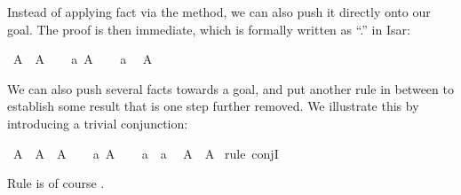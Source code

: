 \begin{isabellebody}
\begin{isamarkuptext}
Instead of applying fact  via the  method, we can
also push it directly onto our goal.  The proof is then immediate,
which is formally written as ``.'' in Isar:%
\end{isamarkuptext}%
\isamarkuptrue%
\isamarkupfalse%
\ {\isachardoublequoteopen}A\ {\isasymlongrightarrow}\ A{\isachardoublequoteclose}\isanewline
%
\isadelimproof
%
\endisadelimproof
%
\isatagproof
{}\isamarkupfalse%
\isanewline
\ \ \isamarkupfalse%
\ a{\isacharcolon}\ {\isachardoublequoteopen}A{\isachardoublequoteclose}\isanewline
\ \ \isamarkupfalse%
\ a\ \isamarkupfalse%
\ {\isachardoublequoteopen}A{\isachardoublequoteclose}\ \isacommand{{\isachardot}}\isamarkupfalse%
\isanewline
{}\isamarkupfalse%
%
\endisatagproof
{\isafoldproof}%
%
\isadelimproof
%
\endisadelimproof
%
\begin{isamarkuptext}%
We can also push several facts towards a goal, and put another
rule in between to establish some result that is one step further
removed.  We illustrate this by introducing a trivial conjunction:%
\end{isamarkuptext}%
\isamarkuptrue%
\isamarkupfalse%
\ {\isachardoublequoteopen}A\ {\isasymlongrightarrow}\ A\ {\isasymand}\ A{\isachardoublequoteclose}\isanewline
%
\isadelimproof
%
\endisadelimproof
%
\isatagproof
{}\isamarkupfalse%
\isanewline
\ \ \isamarkupfalse%
\ a{\isacharcolon}\ {\isachardoublequoteopen}A{\isachardoublequoteclose}\isanewline
\ \ \isamarkupfalse%
\ a\ \ a\ \isamarkupfalse%
\ {\isachardoublequoteopen}A\ {\isasymand}\ A{\isachardoublequoteclose}\ \isamarkupfalse%
{\isacharparenleft}rule\ conjI{\isacharparenright}\isanewline
{}\isamarkupfalse%
%
\endisatagproof
{\isafoldproof}%
%
\isadelimproof
%
\endisadelimproof
%
\begin{isamarkuptext}%
\noindent Rule  is of course .


\end{isamarkuptext}
\end{isabellebody}
